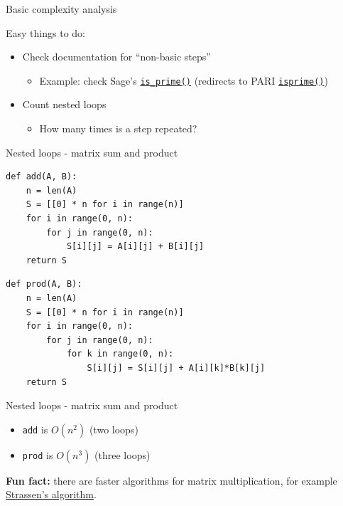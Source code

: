 \documentclass[11pt]{beamer}
\begin{document}

\begin{frame}{Basic complexity analysis}

	Easy things to do:

	\vspace{0.3cm}
	\begin{itemize}
		\item Check documentation for ``non-basic steps''
			\begin{itemize}
				\item Example: check Sage's \href{https://doc.sagemath.org/html/en/reference/rings\_standard/sage/rings/integer.html\#sage.rings.integer.Integer.is\_prime}{\texttt{is\_prime()}} (redirects to PARI \href{https://pari.math.u-bordeaux.fr/dochtml/html/Arithmetic\_functions.html\#se:isprime}{\texttt{isprime()}})
			\end{itemize}

	\vspace{0.3cm}
		\item Count nested loops
			\begin{itemize}
				\item How many times is a step repeated?
			\end{itemize}
	\end{itemize}
\end{frame}

{
\begin{frame}[fragile]{Nested loops - matrix sum and product}
\begin{lstlisting}
def add(A, B):
	n = len(A)
	S = [[0] * n for i in range(n)]
	for i in range(0, n):
		for j in range(0, n):
			S[i][j] = A[i][j] + B[i][j]
	return S
\end{lstlisting}

\vspace{0.5cm}
\begin{lstlisting}
def prod(A, B):
	n = len(A)
	S = [[0] * n for i in range(n)]
	for i in range(0, n):
		for j in range(0, n):
			for k in range(0, n):
				S[i][j] = S[i][j] + A[i][k]*B[k][j]
	return S
\end{lstlisting}
\end{frame}
}

\begin{frame}{Nested loops - matrix sum and product}
	\begin{itemize}
		\item \texttt{add} is $O(n^2)$ (two loops)
		\item \texttt{prod} is $O(n^3)$ (three loops)
	\end{itemize}

	\vspace{0.3cm}
	\textbf{Fun fact:} there are faster algorithms for matrix multiplication,
	for example \href{https://en.wikipedia.org/wiki/Strassen_algorithm}%
	{Strassen's algorithm}.
\end{frame}
\end{document}
